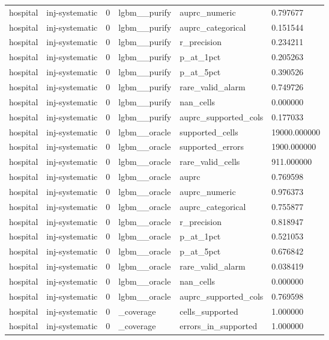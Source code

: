 \begin{tabular}{llllll}
hospital & inj-systematic & 0 & lgbm\_\_purify & auprc\_numeric & 0.797677 \\
hospital & inj-systematic & 0 & lgbm\_\_purify & auprc\_categorical & 0.151544 \\
hospital & inj-systematic & 0 & lgbm\_\_purify & r\_precision & 0.234211 \\
hospital & inj-systematic & 0 & lgbm\_\_purify & p\_at\_1pct & 0.205263 \\
hospital & inj-systematic & 0 & lgbm\_\_purify & p\_at\_5pct & 0.390526 \\
hospital & inj-systematic & 0 & lgbm\_\_purify & rare\_valid\_alarm & 0.749726 \\
hospital & inj-systematic & 0 & lgbm\_\_purify & nan\_cells & 0.000000 \\
hospital & inj-systematic & 0 & lgbm\_\_purify & auprc\_supported\_cols & 0.177033 \\
hospital & inj-systematic & 0 & lgbm\_\_oracle & supported\_cells & 19000.000000 \\
hospital & inj-systematic & 0 & lgbm\_\_oracle & supported\_errors & 1900.000000 \\
hospital & inj-systematic & 0 & lgbm\_\_oracle & rare\_valid\_cells & 911.000000 \\
hospital & inj-systematic & 0 & lgbm\_\_oracle & auprc & 0.769598 \\
hospital & inj-systematic & 0 & lgbm\_\_oracle & auprc\_numeric & 0.976373 \\
hospital & inj-systematic & 0 & lgbm\_\_oracle & auprc\_categorical & 0.755877 \\
hospital & inj-systematic & 0 & lgbm\_\_oracle & r\_precision & 0.818947 \\
hospital & inj-systematic & 0 & lgbm\_\_oracle & p\_at\_1pct & 0.521053 \\
hospital & inj-systematic & 0 & lgbm\_\_oracle & p\_at\_5pct & 0.676842 \\
hospital & inj-systematic & 0 & lgbm\_\_oracle & rare\_valid\_alarm & 0.038419 \\
hospital & inj-systematic & 0 & lgbm\_\_oracle & nan\_cells & 0.000000 \\
hospital & inj-systematic & 0 & lgbm\_\_oracle & auprc\_supported\_cols & 0.769598 \\
hospital & inj-systematic & 0 & \_coverage & cells\_supported & 1.000000 \\
hospital & inj-systematic & 0 & \_coverage & errors\_in\_supported & 1.000000 \\

\end{tabular}
